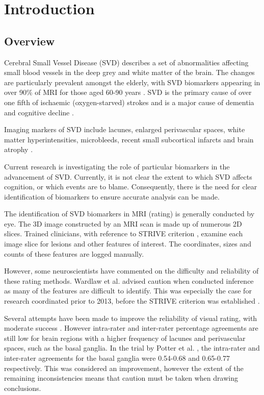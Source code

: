 %
%

\chapter{Introduction}\label{s-intro}

\section{Overview}\label{overview}

{\noindent} Cerebral Small Vessel Disease (SVD) describes a set of abnormalities affecting small blood vessels in the deep grey and white matter of the brain. The changes are particularly prevalent amongst the elderly, with SVD biomarkers appearing in over 90\% of MRI for those aged 60-90 years \cite{deLeeuwF-E2001Pocw}. SVD is the primary cause of over one fifth of ischaemic (oxygen-starved) strokes \cite{SmithStephen2002ARaA} and is a major cause of dementia and cognitive decline \cite{NorrvingBo2008Linb}.

Imaging markers of SVD include lacunes, enlarged perivascular spaces, white matter hyperintensities, microbleeds, recent small subcortical infarcts and brain atrophy \cite{WardlawJ.M.2013Nsfr}.

Current research is investigating the role of particular biomarkers in the advancement of SVD. Currently, it is not clear the extent to which SVD affects cognition, or which events are to blame. Consequently, there is the need for clear identification of biomarkers to ensure accurate analysis can be made.

The identification of SVD biomarkers in MRI (rating) is generally conducted by eye. The 3D image constructed by an MRI scan is made up of numerous 2D slices. Trained clinicians, with reference to STRIVE criterion \cite{WardlawJ.M.2013Nsfr}, examine each image slice for lesions and other features of interest. The coordinates, sizes and counts of these features are logged manually.

However, some neuroscientists have commented on the difficulty and reliability of these rating methods. Wardlaw et al. \cite{WardlawJm2013Mosc} advised caution when conducted inference as many of the features are difficult to identify. This was especially the case for research coordinated prior to 2013, before the STRIVE criterion was established \cite{WardlawJ.M.2013Nsfr}.

Several attempts have been made to improve the reliability of visual rating, with moderate success \cite{AdamsH.H.Hieab2013RMfD, PotterGillian2015CPSV}. However intra-rater and inter-rater percentage agreements are still low for brain regions with a higher frequency of lacunes and perivascular spaces, such as the basal ganglia. In the trial by Potter et al. \cite{PotterGillian2015CPSV},  the intra-rater and inter-rater agreements for the basal ganglia were 0.54-0.68 and 0.65-0.77 respectively. This was considered an improvement, however the extent of the remaining inconsistencies means that caution must be taken when drawing conclusions.

